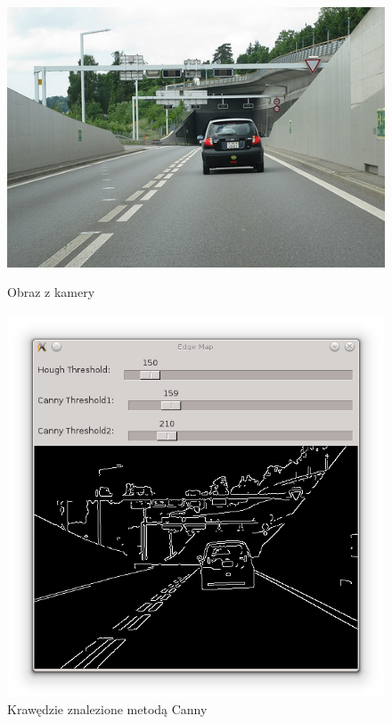 \begin{figure}[!htb]
  \includegraphics[width=\linewidth]{img/road4.jpg}
  \caption{Obraz z kamery}\label{fig:awesome_image1}
\endminipage\hfill
{}
  \includegraphics[width=\linewidth]{img/canny_screen.png}
  \caption{Krawędzie znalezione metodą Canny}\label{fig:awesome_image2}
\endminipage\hfill
{}%

\end{figure}
